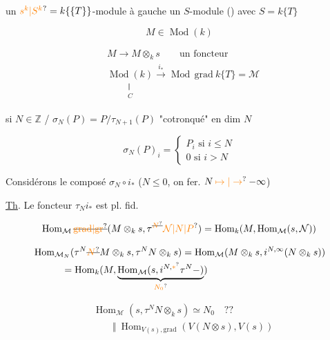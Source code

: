 
un $\unsure{s^k|S^k}=k\{\{T\}\}$-module à gauche un $S$-module () avec $S=k\{T\}$

\[
M\in\operatorname{Mod}(k)
\]

\[
\begin{aligned}
&M\longrightarrow M\otimes_k s\qquad\text{un foncteur}\\
&\underset{\substack{\Vert\\ C}}{\operatorname{Mod}(k)}
 \xrightarrow{i_*}\operatorname{Mod}\,\mathrm{grad}\ k\{T\}=\mathcal M
\end{aligned}
\]

si $N\in\mathbb Z$ / $\sigma_N(P)=P/\tau_{N+1}(P)$ "cotronqué"  en dim $N$

\[
\sigma_N(P)_i=\begin{cases}P_i\text{ si }i\leq N\\0\text{ si }i>N\end{cases}
\]

Considérons le composé $\sigma_N\circ i_*$ ($N\leq0$, on fer. $N\mathbin{\unsure{\mapsto|\to}}-\infty$)

\uline{Th}. Le foncteur $\tau_N i_*$ est pl. fid.

\[
\operatorname{Hom}_{\mathcal M}\deleted{\unsure{\mathrm{grad}|\mathrm{gr}}}(M\otimes_k s,\tau^{\deleted{\unsure{N}}}\unsure{\mathcal N|N|P})
=\operatorname{Hom}_k(M,\operatorname{Hom}_{\mathcal M}(s,\mathcal N))
\]

\[
\begin{aligned}
&\operatorname{Hom}_{\mathcal M_N}(\tau^{N}\deleted{\unsure{N}}M\otimes_k s,\tau^N N\otimes_k s)
 =\operatorname{Hom}_{\mathcal M}(M\otimes_k s,i^{N,\infty}(N\otimes_k s))\\
&\hspace{3em}=\operatorname{Hom}_k(M,\underbrace{\operatorname{Hom}_{\mathcal M}(s,i^{N,\unsure{*}}\tau^N\mathord{-})}_{\unsure{N_0}})
\end{aligned}
\]

\[
\begin{aligned}
&\operatorname{Hom}_{\mathcal M}(s,\tau^N N\otimes_k s)\simeq N_0\quad??\\
&\qquad\Vert\ \operatorname{Hom}_{V(s),\mathrm{grad}}(V(N\otimes s),V(s))
\end{aligned}
\]

